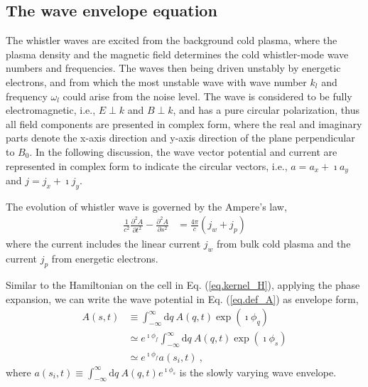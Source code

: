 \subsection{The wave envelope equation}
The whistler waves are excited from the background cold plasma, where the plasma density and the magnetic field determines the cold whistler-mode wave numbers and frequencies. The waves then being driven unstably by energetic electrons, and from which the most unstable wave with wave number $k_l$ and frequency $\omega_l$ could arise from the noise level. The wave is considered to be fully electromagnetic, i.e., $E \perp k$ and $B \perp k$, and has a pure circular polarization, thus all field components are presented in complex form, where the real and imaginary parts denote the x-axis direction and y-axis direction of the plane perpendicular to $B_0$. In the following discussion, the wave vector potential and current are represented in complex form to indicate the circular vectors, i.e., $a = a_x + \imath a_y$ and $j = j_x + \imath j_y$.

The evolution of whistler wave is governed by the Ampere's law, 
\begin{equation}
    \begin{aligned}
        \label{eq.wavemid_1}
        \frac{1}{c^{2}} \frac{\partial^{2} A}{\partial t^{2}}-\frac{\partial^{2} A}{\partial s^{2}} & =\frac{4 \pi}{c}\left(j_w+j_p\right)
    \end{aligned}
\end{equation}
where the current includes the linear current $j_w$ from bulk cold plasma and the current $j_p$ from energetic electrons.

Similar to the Hamiltonian on the cell in Eq. (\ref{eq.kernel_H}), applying the phase expansion, we can write the wave potential in Eq. (\ref{eq.def_A}) as envelope form,
\begin{equation}\label{eq.kernel_A}
    \begin{aligned}
    A(s,t) &\equiv \int_{-\infty}^{\infty}\mathrm{d} q~ A\left(q,t\right) \exp(\imath\phi_{q})
    \\
    & \simeq e^{\imath \phi_f} \int_{-\infty}^{\infty}\mathrm{d} q~ A\left(q,t\right) \exp(\imath\phi_{s})
    \\
    & \simeq e^{\imath \phi_f}  a(s_i, t)~,
    \end{aligned}
\end{equation}
where $a(s_i, t) \equiv \int_{-\infty}^{\infty} \mathrm{d} q~A(q, t) e^{\imath \phi_{s}}$ is the slowly varying wave envelope.

